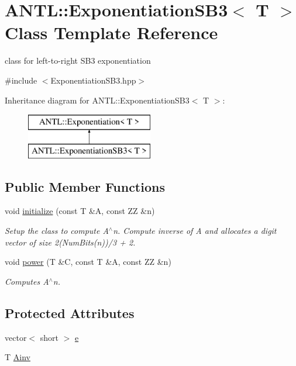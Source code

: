 \hypertarget{classANTL_1_1ExponentiationSB3}{\section{A\-N\-T\-L\-:\-:Exponentiation\-S\-B3$<$ T $>$ Class Template Reference}
\label{classANTL_1_1ExponentiationSB3}
}


class for left-\/to-\/right S\-B3 exponentiation  




{\ttfamily \#include $<$Exponentiation\-S\-B3.\-hpp$>$}

Inheritance diagram for A\-N\-T\-L\-:\-:Exponentiation\-S\-B3$<$ T $>$\-:\begin{figure}[H]
\begin{center}
\leavevmode
\includegraphics[height=2.000000cm]{d8/dfc/classANTL_1_1ExponentiationSB3}
\end{center}
\end{figure}
\subsection*{Public Member Functions}
\begin{DoxyCompactItemize}
\item 
void \hyperlink{classANTL_1_1ExponentiationSB3_a9fd95302e9053e6c69e0a7e822fce60f}{initialize} (const T \&A, const Z\-Z \&n)
\begin{DoxyCompactList}\small\item\em Setup the class to compute A$^\wedge$n. Compute inverse of A and allocates a digit vector of size 2(Num\-Bits(n))/3 + 2. \end{DoxyCompactList}\item 
void \hyperlink{classANTL_1_1ExponentiationSB3_ab985adba341a35c9931aefbd6c8730f5}{power} (T \&C, const T \&A, const Z\-Z \&n)
\begin{DoxyCompactList}\small\item\em Computes A$^\wedge$n. \end{DoxyCompactList}\end{DoxyCompactItemize}
\subsection*{Protected Attributes}
\begin{DoxyCompactItemize}
\item 
vector$<$ short $>$ \hyperlink{classANTL_1_1ExponentiationSB3_a0e535891fd8fa5e406fd9ac080ea1ee9}{e}
\item 
T \hyperlink{classANTL_1_1ExponentiationSB3_a6a63a05ea88cc09a53640aad0fca0be1}{Ainv}
\end{DoxyCompactItemize}


